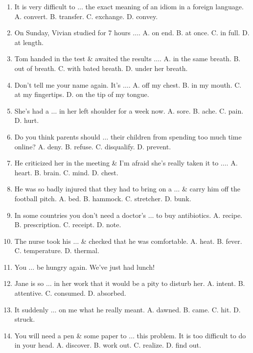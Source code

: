 \documentclass{article}
\numberwithin{equation}{section}
\begin{document}
\begin{enumerate}[leftmargin=2mm]
	\item It is very difficult to $\ldots$ the exact meaning of an idiom in a foreign language. {\sf A.} convert. {\sf B.} transfer. {\sf C.} exchange. {\sf D.} convey.
	\item On Sunday, Vivian studied for 7 hours $\ldots$. {\sf A.} on end. {\sf B.} at once. {\sf C.} in full. {\sf D.} at length.
	\item Tom handed in the test \& awaited the results $\ldots$. {\sf A.} in the same breath. {\sf B.} out of breath. {\sf C.} with bated breath. {\sf D.} under her breath.
	\item Don't tell me your name again. It's $\ldots$. {\sf A.} off my chest. {\sf B.} in my mouth. {\sf C.} at my fingertips. {\sf D.} on the tip of my tongue.
	\item She's had a $\ldots$ in her left shoulder for a week now. {\sf A.} sore. {\sf B.} ache. {\sf C.} pain. {\sf D.} hurt.
	\item Do you think parents should $\ldots$ their children from spending too much time online? {\sf A.} deny. {\sf B.} refuse. {\sf C.} disqualify. {\sf D.} prevent.
	\item He criticized her in the meeting \& I'm afraid she's really taken it to $\ldots$. {\sf A.} heart. {\sf B.} brain. {\sf C.} mind. {\sf D.} chest.
	\item He was so badly injured that they had to bring on a $\ldots$ \& carry him off the football pitch. {\sf A.} bed. {\sf B.} hammock. {\sf C.} stretcher. {\sf D.} bunk.
	\item In some countries you don't need a doctor's $\ldots$ to buy antibiotics. {\sf A.} recipe. {\sf B.} prescription. {\sf C.} receipt. {\sf D.} note.
	\item The nurse took his $\ldots$ \& checked that he was comfortable. {\sf A.} heat. {\sf B.} fever. {\sf C.} temperature. {\sf D.} thermal.
	\item You $\ldots$ be hungry again. We've just had lunch!
	\item Jane is so $\ldots$ in her work that it would be a pity to disturb her. {\sf A.} intent. {\sf B.} attentive. {\sf C.} consumed. {\sf D.} absorbed.
	\item It suddenly $\ldots$ on me what he really meant. {\sf A.} dawned. {\sf B.} came. {\sf C.} hit. {\sf D.} struck.
	\item You will need a pen \& some paper to $\ldots$ this problem. It is too difficult to do in your head. {\sf A.} discover. {\sf B.} work out. {\sf C.} realize. {\sf D.} find out.

\end{enumerate}
\end{document}
